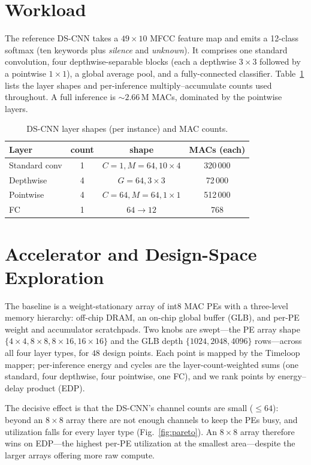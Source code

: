 \documentclass[conference]{IEEEtran}
\newcommand{\approxs}{\ensuremath{\sim}}
\begin{document}
\section{Workload}
The reference DS-CNN takes a $49\times10$ MFCC feature map and emits a 12-class
softmax (ten keywords plus \emph{silence} and \emph{unknown}). It comprises one
standard convolution, four depthwise-separable blocks (each a depthwise $3\times3$
followed by a pointwise $1\times1$), a global average pool, and a
fully-connected classifier. Table~\ref{tab:layers} lists the layer shapes and
per-inference multiply--accumulate counts used throughout. A full inference is
\approxs$2.66$\,M MACs, dominated by the pointwise layers.

\begin{table}[t]
\caption{DS-CNN layer shapes (per instance) and MAC counts.}
\label{tab:layers}
\centering\footnotesize
\begin{tabular}{lccc}
\toprule
Layer & count & shape & MACs (each) \\
\midrule
Standard conv  & 1 & $C{=}1,M{=}64,10{\times}4$ & 320\,000 \\
Depthwise      & 4 & $G{=}64,3{\times}3$        & 72\,000 \\
Pointwise      & 4 & $C{=}64,M{=}64,1{\times}1$ & 512\,000 \\
FC             & 1 & $64{\rightarrow}12$        & 768 \\
\bottomrule
\end{tabular}
\end{table}

\section{Accelerator and Design-Space Exploration}
The baseline is a weight-stationary array of int8 MAC PEs with a three-level
memory hierarchy: off-chip DRAM, an on-chip global buffer (GLB), and per-PE
weight and accumulator scratchpads. Two knobs are swept---the PE array shape
$\{4{\times}4, 8{\times}8, 8{\times}16, 16{\times}16\}$ and the GLB depth
$\{1024, 2048, 4096\}$ rows---across all four layer types, for $48$ design
points. Each point is mapped by the Timeloop mapper; per-inference energy and
cycles are the layer-count-weighted sums (one standard, four depthwise, four
pointwise, one FC), and we rank points by energy--delay product (EDP).

The decisive effect is that the DS-CNN's channel counts are small ($\le 64$):
beyond an $8\times8$ array there are not enough channels to keep the PEs busy,
and utilization falls for every layer type (Fig.~\ref{fig:pareto}). An
$8\times8$ array therefore wins on EDP---the highest per-PE utilization at the
smallest area---despite the larger arrays offering more raw compute.
\end{document}
